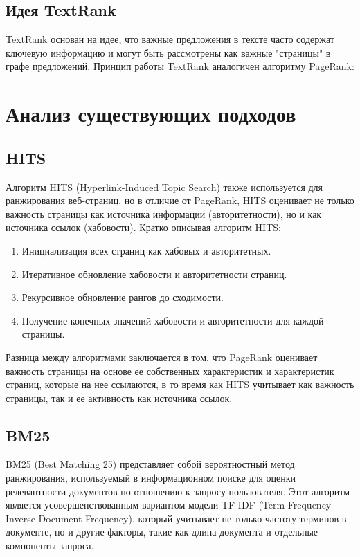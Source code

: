 \documentclass[a4paper]{article}
\begin{document}
		\subsection{Идея TextRank}
			TextRank основан на идее, что важные предложения в тексте часто содержат ключевую информацию и могут быть рассмотрены как важные "страницы" в графе предложений. Принцип работы TextRank аналогичен алгоритму PageRank:
	\newpage
	\section{Анализ существующих подходов}
		\subsection{HITS}	
			Алгоритм HITS (Hyperlink-Induced Topic Search) также используется для ранжирования веб-страниц, но в отличие от PageRank, HITS оценивает не только важность страницы как источника информации (авторитетности), но и как источника ссылок (хабовости). Кратко описывая алгоритм HITS:

			\begin{enumerate}
				\item Инициализация всех страниц как хабовых и авторитетных.
				\item Итеративное обновление хабовости и авторитетности страниц.
				\item Рекурсивное обновление рангов до сходимости.
				\item Получение конечных значений хабовости и авторитетности для каждой страницы.
			\end{enumerate}

			Разница между алгоритмами заключается в том, что PageRank оценивает важность страницы на основе ее собственных характеристик и характеристик страниц, которые на нее ссылаются, в то время как HITS учитывает как важность страницы, так и ее активность как источника ссылок.
		\subsection{BM25}
			BM25 (Best Matching 25) представляет собой вероятностный метод ранжирования, используемый в информационном поиске для оценки релевантности документов по отношению к запросу пользователя. Этот алгоритм является усовершенствованным вариантом модели TF-IDF (Term Frequency-Inverse Document Frequency), который учитывает не только частоту терминов в документе, но и другие факторы, такие как длина документа и отдельные компоненты запроса.
			
\end{document}
